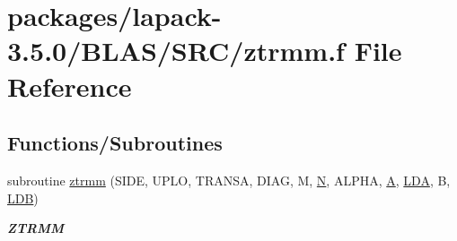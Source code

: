 \hypertarget{lapack-3_85_80_2BLAS_2SRC_2ztrmm_8f}{}\section{packages/lapack-\/3.5.0/\+B\+L\+A\+S/\+S\+R\+C/ztrmm.f File Reference}
\label{lapack-3_85_80_2BLAS_2SRC_2ztrmm_8f}
\subsection*{Functions/\+Subroutines}
\begin{DoxyCompactItemize}
\item 
subroutine \hyperlink{group__complex16__blas__level3_gafa941b30529f8c06ffb6a1b2e09e0abd}{ztrmm} (S\+I\+D\+E, U\+P\+L\+O, T\+R\+A\+N\+S\+A, D\+I\+A\+G, M, \hyperlink{polmisc_8c_a0240ac851181b84ac374872dc5434ee4}{N}, A\+L\+P\+H\+A, \hyperlink{classA}{A}, \hyperlink{example__user_8c_ae946da542ce0db94dced19b2ecefd1aa}{L\+D\+A}, B, \hyperlink{example__user_8c_a50e90a7104df172b5a89a06c47fcca04}{L\+D\+B})
\begin{DoxyCompactList}\small\item\em {\bfseries Z\+T\+R\+M\+M} \end{DoxyCompactList}\end{DoxyCompactItemize}
